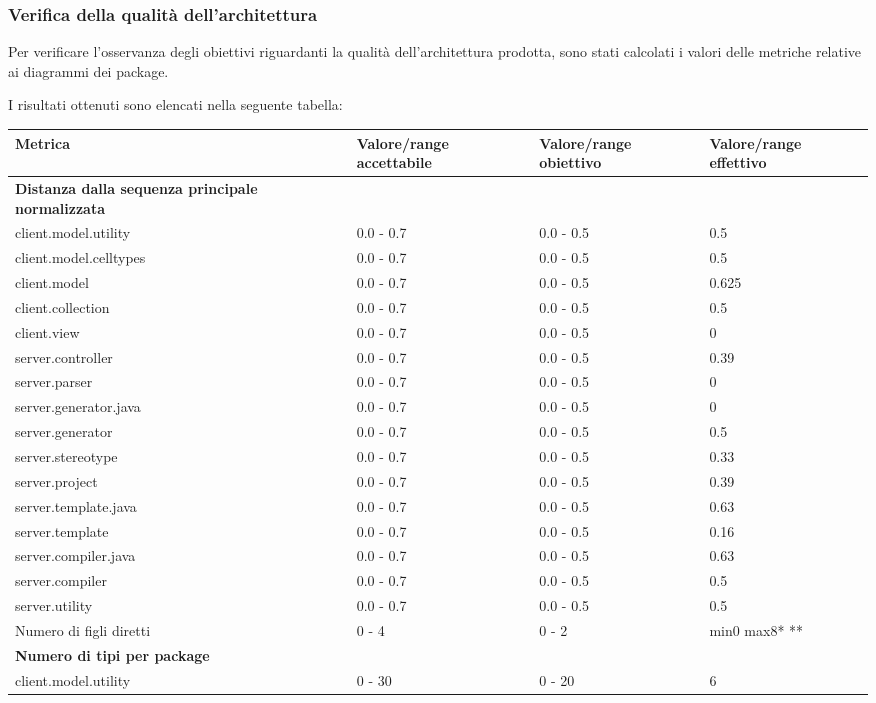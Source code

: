 		\subsubsection{Verifica della qualità dell'architettura}
		Per verificare l'osservanza degli obiettivi riguardanti la qualità dell'architettura prodotta, sono stati calcolati i valori delle metriche relative ai diagrammi dei package.
		
		I risultati ottenuti sono elencati nella seguente tabella:
		\begin{longtable}{|p{5.5cm}|p{2.25cm}|p{2.25cm}|p{2.25cm}|}
		\hline
		\textbf{Metrica} 		 					&\textbf{Valore/range accettabile}	&\textbf{Valore/range obiettivo}	&\textbf{Valore/range effettivo}\\
		\hline
		\textbf{Distanza dalla sequenza principale normalizzata} & & &\\
		client.model.utility &0.0 - 0.7 &0.0 - 0.5 &0.5\\
		client.model.celltypes &0.0 - 0.7 &0.0 - 0.5 &0.5\\
		client.model &0.0 - 0.7 &0.0 - 0.5 &0.625\\
		client.collection &0.0 - 0.7 &0.0 - 0.5 &0.5\\
		client.view &0.0 - 0.7 &0.0 - 0.5 &0\\
		server.controller &0.0 - 0.7 &0.0 - 0.5 &0.39\\
		server.parser  &0.0 - 0.7 &0.0 - 0.5 &0\\
		server.generator.java  &0.0 - 0.7 &0.0 - 0.5 &0\\
		server.generator &0.0 - 0.7 &0.0 - 0.5 &0.5\\
		server.stereotype  &0.0 - 0.7 &0.0 - 0.5 &0.33\\
		server.project  &0.0 - 0.7 &0.0 - 0.5 &0.39\\
		server.template.java  &0.0 - 0.7 &0.0 - 0.5 &0.63\\
		server.template  &0.0 - 0.7 &0.0 - 0.5 &0.16\\
		server.compiler.java  &0.0 - 0.7 &0.0 - 0.5 &0.63\\
		server.compiler  &0.0 - 0.7 &0.0 - 0.5 &0.5\\
		server.utility  &0.0 - 0.7 &0.0 - 0.5 &0.5\\
		\hline
		Numero di figli diretti &0 - 4 &0 - 2 &min0 max8* **\\
		\hline
		\textbf{Numero di tipi per package} & & &\\
		client.model.utility &0 - 30 &0 - 20 &6\\

\end{longtable}
